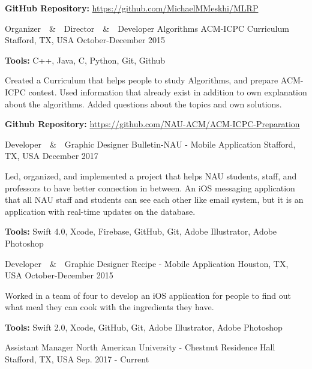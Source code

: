 \begin{cventries}
{\begin{cvitems}
        \item {\textbf{GitHub Repository:} \href{https://github.com/MichaelMMeskhi/MLRP}{https://github.com/MichaelMMeskhi/MLRP}}
      \end{cvitems}
    }
    \cventry
  	{Organizer~~\&~~Director~~\&~~Developer}
    {Algorithms ACM-ICPC Curriculum}
    {Stafford, TX, USA}
    {October-December 2015}
    {
      \begin{cvitems}
      	\item {\textbf{Tools:} C++, Java, C, Python, Git, Github}
        \item {Created a Curriculum that helps people to study Algorithms, and prepare ACM-ICPC contest. Used information that already exist
 in addition to own explanation about the algorithms. Added questions about the topics and own solutions.}
		\item{\textbf{Github Repository:}  \href{https://github.com/NAU-ACM/ACM-ICPC-Preparation}{https://github.com/NAU-ACM/ACM-ICPC-Preparation}} 
      \end{cvitems}
    }
  \cventry
  	{Developer~~\&~~Graphic Designer}
    {Bulletin-NAU - \tiny{Mobile Application}}
    {Stafford, TX, USA}
    {December 2017}
    {
      \begin{cvitems}
        \item {Led, organized, and implemented a project that helps NAU students, staff, and professors to have better connection in between. An iOS messaging application that all NAU staff and students can see each other like email system, but it is an application with real-time updates on the database.}
        \item {\textbf{Tools:} Swift 4.0, Xcode, Firebase, GitHub, Git, Adobe Illustrator, Adobe Photoshop}
      \end{cvitems}
    }
    \cventry
  	{Developer~~\&~~Graphic Designer}
    {Recipe - \tiny{Mobile Application}}
    {Houston, TX, USA}
    {October-December 2015}
    {
      \begin{cvitems}
        \item {Worked in a team of four to develop an iOS application for people to find out what meal they can cook with the ingredients they have.}
        \item {\textbf{Tools:} Swift 2.0, Xcode, GitHub, Git, Adobe Illustrator, Adobe Photoshop}
      \end{cvitems}
    }
    \cventry
  	{Assistant Manager}
    {North American University - Chestnut Residence Hall}
    {Stafford, TX, USA}
    {Sep. 2017 - Current}

\end{cventries}
